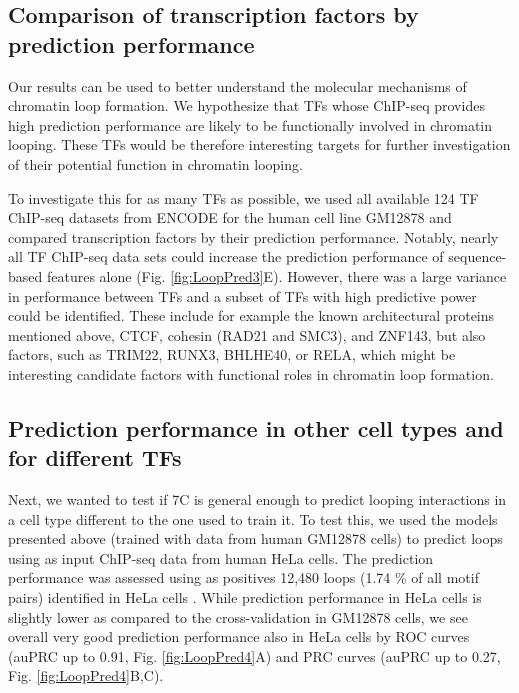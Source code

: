 \documentclass[a4paper,twoside=true,openright,parskip=full,chapterprefix=true,11pt,headings=normal,bibliography=totoc,listof=totoc,titlepage=on,captions=tableabove,draft=false]{scrreprt}
\theoremstyle{definition}
\theoremstyle{definition}
\theoremstyle{definition}
\theoremstyle{remark}
\begin{document}
\hypertarget{comparison-of-transcription-factors-by-prediction-performance}{%
\subsection{Comparison of transcription factors by prediction
performance}\label{comparison-of-transcription-factors-by-prediction-performance}}

Our results can be used to better understand the molecular mechanisms of
chromatin loop formation. We hypothesize that TFs whose ChIP-seq
provides high prediction performance are likely to be functionally
involved in chromatin looping. These TFs would be therefore interesting
targets for further investigation of their potential function in
chromatin looping.

To investigate this for as many TFs as possible, we used all available
124 TF ChIP-seq datasets from ENCODE for the human cell line GM12878 and
compared transcription factors by their prediction performance. Notably,
nearly all TF ChIP-seq data sets could increase the prediction
performance of sequence-based features alone (Fig.
\ref{fig:LoopPred3}E). However, there was a large variance in
performance between TFs and a subset of TFs with high predictive power
could be identified. These include for example the known architectural
proteins mentioned above, CTCF, cohesin (RAD21 and SMC3), and ZNF143,
but also factors, such as TRIM22, RUNX3, BHLHE40, or RELA, which might
be interesting candidate factors with functional roles in chromatin loop
formation.

\hypertarget{prediction-performance-in-other-cell-types-and-for-different-tfs}{%
\subsection{Prediction performance in other cell types and for different
TFs}\label{prediction-performance-in-other-cell-types-and-for-different-tfs}}

Next, we wanted to test if 7C is general enough to predict looping
interactions in a cell type different to the one used to train it. To
test this, we used the models presented above (trained with data from
human GM12878 cells) to predict loops using as input ChIP-seq data from
human HeLa cells. The prediction performance was assessed using as
positives 12,480 loops (1.74 \% of all motif pairs) identified in HeLa
cells \citep{Rao2014, Tang2015}. While prediction performance in HeLa
cells is slightly lower as compared to the cross-validation in GM12878
cells, we see overall very good prediction performance also in HeLa
cells by ROC curves (auPRC up to 0.91, Fig. \ref{fig:LoopPred4}A) and
PRC curves (auPRC up to 0.27, Fig. \ref{fig:LoopPred4}B,C).
\end{document}

